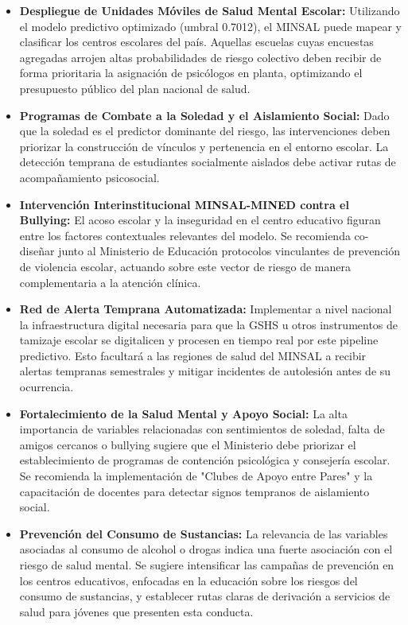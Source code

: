 \documentclass[10pt,journal,compsoc]{IEEEtran}
\begin{document}
\begin{itemize}
    \item \textbf{Despliegue de Unidades Móviles de Salud Mental Escolar:} Utilizando el modelo predictivo optimizado (umbral 0.7012), el MINSAL puede mapear y clasificar los centros escolares del país. Aquellas escuelas cuyas encuestas agregadas arrojen altas probabilidades de riesgo colectivo deben recibir de forma prioritaria la asignación de psicólogos en planta, optimizando el presupuesto público del plan nacional de salud.

    \item \textbf{Programas de Combate a la Soledad y el Aislamiento Social:} Dado que la soledad es el predictor dominante del riesgo, las intervenciones deben priorizar la construcción de vínculos y pertenencia en el entorno escolar. La detección temprana de estudiantes socialmente aislados debe activar rutas de acompañamiento psicosocial.

    \item \textbf{Intervención Interinstitucional MINSAL-MINED contra el Bullying:} El acoso escolar y la inseguridad en el centro educativo figuran entre los factores contextuales relevantes del modelo. Se recomienda co-diseñar junto al Ministerio de Educación protocolos vinculantes de prevención de violencia escolar, actuando sobre este vector de riesgo de manera complementaria a la atención clínica.

    \item \textbf{Red de Alerta Temprana Automatizada:} Implementar a nivel nacional la infraestructura digital necesaria para que la GSHS u otros instrumentos de tamizaje escolar se digitalicen y procesen en tiempo real por este pipeline predictivo. Esto facultará a las regiones de salud del MINSAL a recibir alertas tempranas semestrales y mitigar incidentes de autolesión antes de su ocurrencia.

    \item \textbf{Fortalecimiento de la Salud Mental y Apoyo Social:} La alta importancia de variables relacionadas con sentimientos de soledad, falta de amigos cercanos o bullying sugiere que el Ministerio debe priorizar el establecimiento de programas de contención psicológica y consejería escolar. Se recomienda la implementación de "Clubes de Apoyo entre Pares" y la capacitación de docentes para detectar signos tempranos de aislamiento social.

    \item \textbf{Prevención del Consumo de Sustancias:} La relevancia de las variables asociadas al consumo de alcohol o drogas indica una fuerte asociación con el riesgo de salud mental. Se sugiere intensificar las campañas de prevención en los centros educativos, enfocadas en la educación sobre los riesgos del consumo de sustancias, y establecer rutas claras de derivación a servicios de salud para jóvenes que presenten esta conducta.


\end{itemize}
\end{document}
